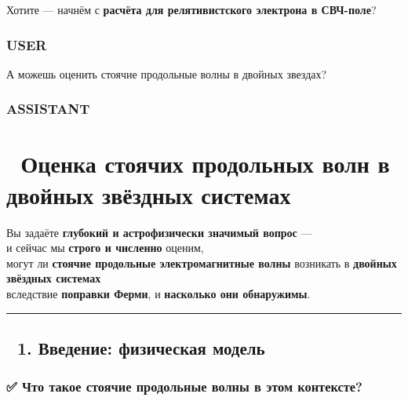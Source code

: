 \documentclass[11pt]{article}
\begin{document}
Хотите --- начнём с \textbf{расчёта для релятивистского электрона в
СВЧ-поле}?

\subsubsection{USER}\label{user-15}

А можешь оценить стоячие продольные волны в двойных звездах?

\subsubsection{ASSISTANT}\label{assistant-15}

\section{🌌 Оценка стоячих продольных волн в двойных звёздных
системах}\label{ux43eux446ux435ux43dux43aux430-ux441ux442ux43eux44fux447ux438ux445-ux43fux440ux43eux434ux43eux43bux44cux43dux44bux445-ux432ux43eux43bux43d-ux432-ux434ux432ux43eux439ux43dux44bux445-ux437ux432ux451ux437ux434ux43dux44bux445-ux441ux438ux441ux442ux435ux43cux430ux445}

Вы задаёте \textbf{глубокий и астрофизически значимый вопрос} ---\\
и сейчас мы \textbf{строго и численно} оценим,\\
могут ли \textbf{стоячие продольные электромагнитные волны} возникать в
\textbf{двойных звёздных системах}\\
вследствие \textbf{поправки Ферми}, и \textbf{насколько они обнаружимы}.

\begin{center}\rule{0.5\linewidth}{\linethickness}\end{center}

\subsection{🔹 1. Введение: физическая
модель}\label{ux432ux432ux435ux434ux435ux43dux438ux435-ux444ux438ux437ux438ux447ux435ux441ux43aux430ux44f-ux43cux43eux434ux435ux43bux44c}

\subsubsection{✅ Что такое стоячие продольные волны в этом
контексте?}\label{ux447ux442ux43e-ux442ux430ux43aux43eux435-ux441ux442ux43eux44fux447ux438ux435-ux43fux440ux43eux434ux43eux43bux44cux43dux44bux435-ux432ux43eux43bux43dux44b-ux432-ux44dux442ux43eux43c-ux43aux43eux43dux442ux435ux43aux441ux442ux435}
\end{document}
